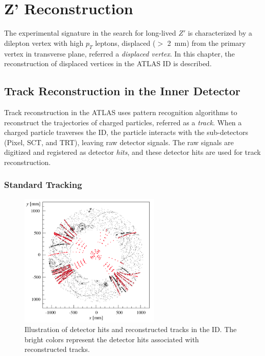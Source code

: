 \chapter{Z' Reconstruction}
\label{chap:reco}

The experimental signature in the search for long-lived $Z'$ is characterized by a dilepton vertex with high $p_{T}$ leptons, displaced ($>$ 2~\si{\milli\meter}) from the primary vertex in transverse plane, referred a \textit{displaced vertex}. In this chapter, the reconstruction of displaced vertices in the ATLAS ID is described.

\section{Track Reconstruction in the Inner Detector}
\label{sec:reco:track}

Track reconstruction in the ATLAS uses pattern recognition algorithms to reconstruct the trajectories of charged particles, referred as a \textit{track}. When a charged particle traverses the ID, the particle interacts with the sub-detectors (Pixel, SCT, and TRT), leaving raw detector signals. The raw signals are digitized and registered as detector \textit{hits}, and these detector hits are used for track reconstruction. 

\subsection{Standard Tracking}
\label{sec:reco:st}


\begin{figure}[!htb]
    \includegraphics[width=0.6\textwidth]{figures/tracking.png}
    \centering
    \caption{Illustration of detector hits and reconstructed tracks in the ID. The bright colors represent the detector hits associated with reconstructed tracks.}
    \label{fig:tracking}
\end{figure}


